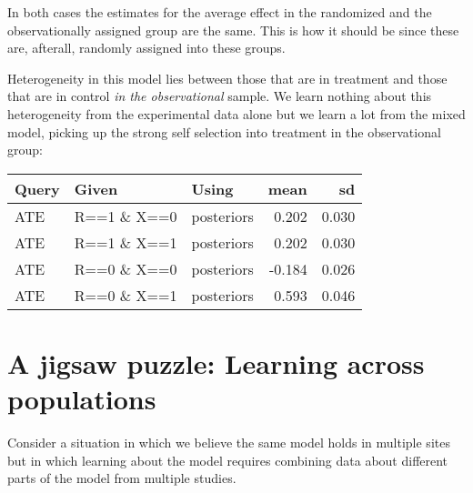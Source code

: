 \documentclass[
  12pt,
]{book}
\newenvironment{Shaded}{\begin{snugshade}}{\end{snugshade}}
\newcommand{\DataTypeTok}[1]{\textcolor[rgb]{0.13,0.29,0.53}{#1}}
\newcommand{\DecValTok}[1]{\textcolor[rgb]{0.00,0.00,0.81}{#1}}
\newcommand{\KeywordTok}[1]{\textcolor[rgb]{0.13,0.29,0.53}{\textbf{#1}}}
\newcommand{\NormalTok}[1]{#1}
\newcommand{\OperatorTok}[1]{\textcolor[rgb]{0.81,0.36,0.00}{\textbf{#1}}}
\newcommand{\StringTok}[1]{\textcolor[rgb]{0.31,0.60,0.02}{#1}}
\begin{document}
In both cases the estimates for the average effect in the randomized and the observationally assigned group are the same. This is how it should be since these are, afterall, randomly assigned into these groups.

Heterogeneity in this model lies between those that are in treatment and those that are in control \emph{in the observational} sample. We learn nothing about this heterogeneity from the experimental data alone but we learn a lot from the mixed model, picking up the strong self selection into treatment in the observational group:

\begin{tabular}{l|l|l|r|r}
\hline
Query & Given & Using & mean & sd\\
\hline
ATE & R==1 \& X==0 & posteriors & 0.202 & 0.030\\
\hline
ATE & R==1 \& X==1 & posteriors & 0.202 & 0.030\\
\hline
ATE & R==0 \& X==0 & posteriors & -0.184 & 0.026\\
\hline
ATE & R==0 \& X==1 & posteriors & 0.593 & 0.046\\
\hline
\end{tabular}

\hypertarget{a-jigsaw-puzzle-learning-across-populations}{%
\section{A jigsaw puzzle: Learning across populations}\label{a-jigsaw-puzzle-learning-across-populations}}

Consider a situation in which we believe the same model holds in multiple sites but in which learning about the model requires combining data about different parts of the model from multiple studies.

\begin{Shaded}
\end{Shaded}
\end{document}
